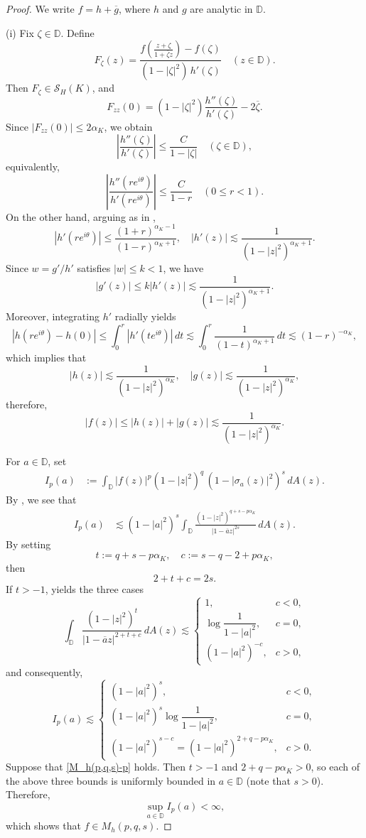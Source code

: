 \documentclass[12pt, reqno]{amsart}
\begin{document}
\begin{proof}
We write $f=h+\overline{g}$, where $h$ and $g$ are analytic in $\mathbb{D}$.

\medskip
{(i)} Fix $\zeta\in\mathbb{D}$. Define
\[
F_\zeta(z)=\frac{f\!\left(\frac{z+\zeta}{1+\overline{\zeta}z}\right)-f(\zeta)}{(1-|\zeta|^2)\,h'(\zeta)}\quad (z\in\mathbb{D}).
\]
Then $F_\zeta\in \mathcal{S}_H(K)$, and
\[
F_{zz}(0)=(1-|\zeta|^2)\frac{h''(\zeta)}{h'(\zeta)}-2\overline{\zeta}.
\]
Since $|F_{zz}(0)|\le 2\alpha_K$, we obtain
\[
\left|\frac{h''(\zeta)}{h'(\zeta)}\right|\le \frac{C}{1-|\zeta|}\quad (\zeta\in\mathbb{D}),
\]
equivalently,
\[
\left|\frac{h''(re^{i\theta})}{h'(re^{i\theta})}\right|\le \frac{C}{1-r}\quad (0\le r<1).
\]
On the other hand, arguing as in \cite[p.\,98]{DP},
\[
|h'(re^{i\theta})|\le \frac{(1+r)^{\alpha_K-1}}{(1-r)^{\alpha_K+1}},
\quad
|h'(z)|\lesssim \frac{1}{(1-|z|^2)^{\alpha_K+1}}.
\]
Since $w={g'}/{h'}$ satisfies $|w|\le k<1$, we have
\[
|g'(z)|\le k|h'(z)|\lesssim \frac{1}{(1-|z|^2)^{\alpha_K+1}}.
\]
Moreover, integrating $h'$ radially yields
\[
|h(re^{i\theta})-h(0)|
\le \int_0^r |h'(te^{i\theta})|\,dt
\lesssim \int_0^r \frac{1}{(1-t)^{\alpha_K+1}}\,dt
\lesssim (1-r)^{-\alpha_K},
\]
which implies that
\[
|h(z)|\lesssim \frac{1}{(1-|z|^2)^{\alpha_K}},
\quad
|g(z)|\lesssim \frac{1}{(1-|z|^2)^{\alpha_K}},
\]
therefore,
\[
|f(z)|\le |h(z)|+|g(z)|\lesssim \frac{1}{(1-|z|^2)^{\alpha_K}}.
\]

For $a\in\mathbb D$, set
\begin{align*}
I_p(a)
&:=\int_{\mathbb{D}} |f(z)|^{p}(1-|z|^2)^{q}\,(1-|\sigma_a(z)|^2)^{s}\,dA(z).
\end{align*}
By \cite[Lemma 3.10]{ZK}, we see that
\begin{align*}
I_p(a)
&\lesssim (1-|a|^2)^{s}\int_{\mathbb{D}}
\frac{(1-|z|^2)^{q+s-p\alpha_K}}{|1-\overline{a}z|^{2s}}\,dA(z).
\end{align*}
By setting
\[
t:=q+s-p\alpha_K,\quad c:=s-q-2+p\alpha_K,
\]
then $$2+t+c=2s.$$ If $t>-1$, \cite[Lemma 3.10]{ZK} yields the three cases
\[
\int_{\mathbb{D}}
\frac{(1-|z|^2)^{t}}{|1-\overline{a}z|^{2+t+c}}\,dA(z)
\lesssim
\begin{cases}
1, & c<0,\\[1mm]
\log\!\dfrac{1}{1-|a|^2}, & c=0,\\[2mm]
(1-|a|^2)^{-c}, & c>0,
\end{cases}
\]
and consequently,
\[
I_p(a)\lesssim
\begin{cases}
(1-|a|^2)^s, & c<0,\\[1mm]
(1-|a|^2)^s\log\!\dfrac{1}{1-|a|^2}, & c=0,\\[2mm]
(1-|a|^2)^{s-c}=(1-|a|^2)^{2+q-p\alpha_K}, & c>0.
\end{cases}
\]
Suppose that \eqref{M_h(p,q,s)-p} holds. Then $t>-1$ and $2+q-p\alpha_K>0$, so each of the above three bounds is uniformly bounded in $a\in\mathbb D$ (note that $s>0$).
Therefore, $$\sup_{a\in\mathbb D} I_p(a)<\infty,$$ which shows that $f\in M_h(p,q,s)$.


\end{proof}
\end{document}
